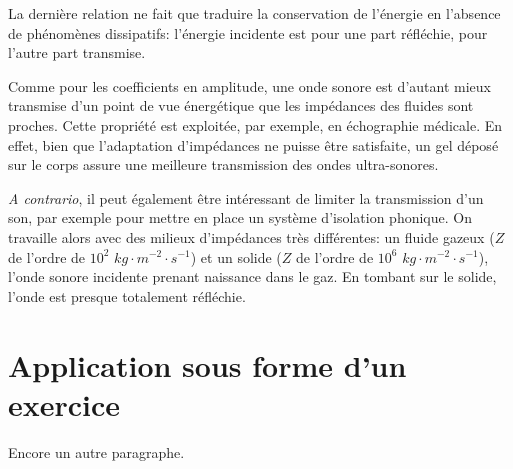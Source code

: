 \documentclass[a4paper, 12pt]{article}
\begin{document}
La dernière relation ne fait que traduire la conservation de l'énergie en l'absence de phénomènes dissipatifs: l'énergie incidente est pour une part réfléchie, pour l'autre part transmise.

Comme pour les coefficients en amplitude, une onde sonore est d'autant mieux transmise d'un point de vue énergétique que les impédances des fluides sont proches. Cette propriété est exploitée, par exemple, en échographie médicale. En effet, bien que l'adaptation d'impédances ne puisse être satisfaite, un gel déposé sur le corps assure une meilleure transmission des ondes ultra-sonores.

\textit{A contrario}, il peut également être intéressant de limiter la transmission d'un son, par exemple pour mettre en place un système d'isolation phonique. On travaille alors avec des milieux d'impédances très différentes: un fluide gazeux ($Z$ de l'ordre de $10^{2}$ $kg\cdot m^{-2}\cdot s^{-1}$) et un solide ($Z$ de l'ordre de $10^{6}$ $kg\cdot m^{-2}\cdot s^{-1}$), l'onde sonore incidente prenant naissance dans le gaz. En tombant sur le solide, l'onde est presque totalement réfléchie.

\newpage
\section{Application sous forme d'un exercice}

\begin{doublespace}
Encore un autre paragraphe.
\end{doublespace}
\end{document}
